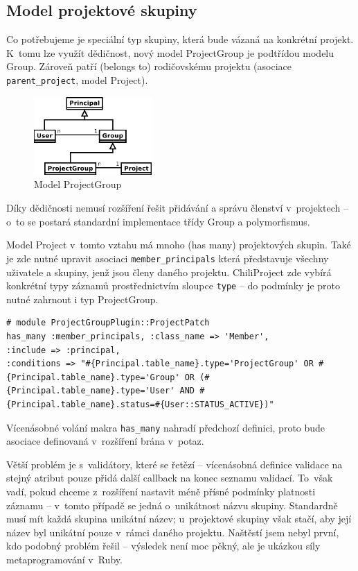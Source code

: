 \documentclass[thesis=B,czech]{FITthesis}[2012/05/02]
\begin{document}
\subsection{Model projektové skupiny}

Co potřebujeme je speciální typ skupiny, která bude vázaná na konkrétní
projekt. K~tomu lze využít dědičnost, nový model ProjectGroup je
podtřídou modelu Group. Zároveň patří (belongs to) rodičovskému projektu
(asociace \lstinline!parent_project!, model Project).

\begin{figure}[bp]
\centering
\includegraphics[width=0.4\textwidth]{group-er3.pdf}
\caption{Model ProjectGroup}
\end{figure}

Díky dědičnosti nemusí rozšíření řešit přidávání a správu členství
v~projektech -- o~to se postará standardní implementace třídy Group a
polymorfismus.

Model Project v~tomto vztahu má mnoho (has many) projektových skupin.
Také je zde nutné upravit asociaci \lstinline!member_principals! která
představuje všechny uživatele a skupiny, jenž jsou členy daného projektu.
ChiliProject zde vybírá konkrétní typy záznamů prostřednictvím sloupce
\lstinline!type! -- do podmínky je proto nutné zahrnout i typ
ProjectGroup.

\begin{lstlisting}
# module ProjectGroupPlugin::ProjectPatch
has_many :member_principals, :class_name => 'Member',
:include => :principal,
:conditions => "#{Principal.table_name}.type='ProjectGroup' OR #{Principal.table_name}.type='Group' OR (#{Principal.table_name}.type='User' AND #{Principal.table_name}.status=#{User::STATUS_ACTIVE})"
\end{lstlisting}
Vícenásobné volání makra \lstinline!has_many! nahradí předchozí
definici, proto bude asociace definovaná v~rozšíření brána v~potaz.

Větší problém je s~validátory, které se řetězí -- vícenásobná definice
validace na stejný atribut pouze přidá další \gls{callback} na konec
seznamu validací. To~však vadí, pokud chceme z~rozšíření nastavit méně
přísné podmínky platnosti záznamu -- v~tomto případě se jedná
o~unikátnost názvu skupiny. Standardně musí mít každá skupina unikátní
název; u~projektové skupiny však stačí, aby její název byl unikátní pouze v~rámci daného
projektu. Naštěstí jsem nebyl první, kdo podobný problém řešil
\citep{McAlpin2011} -- výsledek není moc pěkný, ale je ukázkou síly
metaprogramování v~Ruby.
\end{document}
